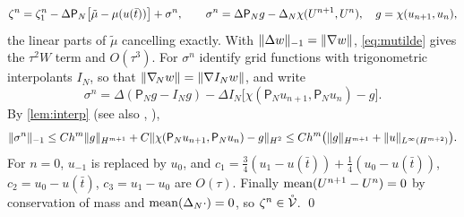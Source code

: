 \[
\zeta^n=\zeta_1^n-\Delta\mathsf P_N\big[\tilde\mu-\mu(u(\bar t))\big]+\sigma^n,\qquad \sigma^n=\Delta\mathsf P_Ng-\Delta_N\chi(U^{n+1},U^n),\quad g=\chi(u_{n+1},u_n),
\]
the linear parts of $\tilde\mu$ cancelling exactly. With $\lVert \Delta w\rVert_{-1}=\lVert \nabla w\rVert$, \eqref{eq:mutilde} gives the $\tau^2W$ term and $O(\tau^3)$. For $\sigma^n$ identify grid functions with trigonometric interpolants $I_N$, so that $\lVert \nabla_{\!N} w\rVert=\lVert \nabla I_Nw\rVert$, and write
\[
\sigma^n=\Delta(\mathsf P_Ng-I_Ng)-\Delta I_N\big[\chi(\mathsf P_Nu_{n+1},\mathsf P_Nu_n)-g\big].
\]
By \cref{lem:interp} (see also \cite[\S5.1]{CHQZ2006}, \cite{GottliebWang2012}),
\[
\lVert \sigma^n\rVert_{-1}\le Ch^m\lVert g\rVert_{H^{m+1}}+C\lVert \chi(\mathsf P_Nu_{n+1},\mathsf P_Nu_n)-g\rVert_{H^2}\le Ch^m\big(\lVert g\rVert_{H^{m+1}}+\lVert u\rVert_{L^\infty(H^{m+2})}\big).
\]
For $n=0$, $u_{-1}$ is replaced by $u_0$, and $c_1=\frac34(u_1-u(\bar t))+\frac14(u_0-u(\bar t))$, $c_2=u_0-u(\bar t)$, $c_3=u_1-u_0$ are $O(\tau)$. Finally $\operatorname{mean}(U^{n+1}-U^n)=0$ by conservation of mass and $\operatorname{mean}(\Delta_N\cdot)=0$, so $\zeta^n\in\mathring{\mathcal{V}}$.
\qed

